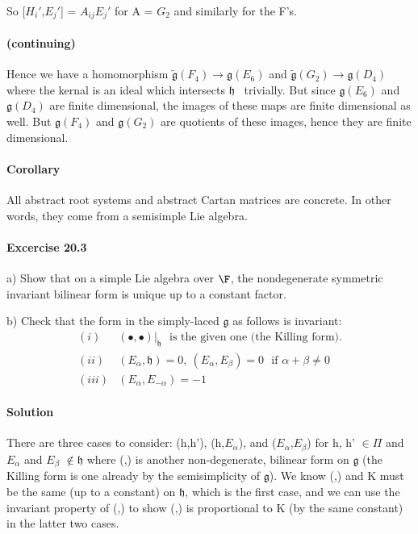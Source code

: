 \documentclass[11pt]{article}
\newcommand{\g}{\ensuremath{\mathfrak{g}}}
\newcommand{\h}{\ensuremath{\mathfrak{h}}}
\begin{document}
So [$H_i'$,$E_j'$] = $A_{i j}E_j'$ for A = $G_2$ and similarly for the F's.

\paragraph{(continuing)}
Hence we have a homomorphism $\tilde{\g}(F_4) \rightarrow \g(E_6)$ and
$\tilde{\g}(G_2) \rightarrow \g(D_4)$ where the kernal is an ideal
which intersects \h~ trivially. But since $\g(E_6)$ and $\g(D_4)$ are
finite dimensional, the images of these maps are finite dimensional as well.
But $\g(F_4)$ and $\g(G_2)$ are quotients of these images, hence they are
finite dimensional.

\paragraph{Corollary}
All abstract root systems and abstract Cartan matrices are concrete. In other
words, they come from a semisimple Lie algebra.

\paragraph{Excercise 20.3} a) Show that on a simple Lie algebra over $\F$,
the nondegenerate symmetric invariant bilinear form is unique up to a constant factor.

b) Check that the form in the simply-laced $\g$ as follows is invariant:
\begin{align*}
(i) & (\bullet,\bullet)\vert_{\h}~~~ \text{is the given one (the Killing form).} \\
(ii) & (E_{\alpha},\h)=0,~(E_{\alpha},E_{\beta})= 0 ~~~ \text{if $\alpha+\beta
\neq 0$} \\
(iii)& (E_{\alpha},E_{-\alpha})=-1
\end{align*}

\paragraph{Solution}
There are three cases to consider: (h,h'), (h,$E_\alpha$), and ($E_\alpha$,$E_\beta$) for h, h' $\in \Pi$ and $E_\alpha$ and $E_\beta$ $\notin \h$ where (,) is another non-degenerate, bilinear form on $\g$ (the Killing form is one already by the semisimplicity of $\g$).  We know (,) and K must be the same (up to a constant) on $\h$, which is the first case, and we can use the invariant property of (,) to show (,) is proportional to K (by the same constant) in the latter two cases.
\end{document}
